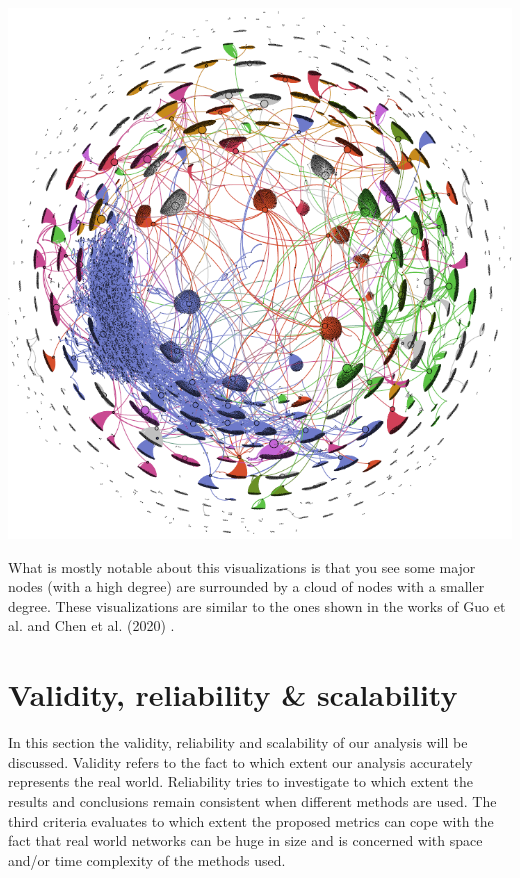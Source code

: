 \documentclass[10pt,a4paper]{article}
\newenvironment{Figure}
  {\par\medskip\noindent\minipage{\linewidth}}
  {\endminipage\par\medskip}
\begin{document}
\begin{multicols}{2}
\begin{Figure}
\centering
\label{fig:my_label}
\includegraphics[scale=0.385]{figures/Marc21_edges.png}
\label{clusters}
\end{Figure}

What is mostly notable about this visualizations is that you see some major nodes (with a high degree) are surrounded by a cloud of nodes with a smaller degree. These visualizations are similar to the ones shown in the works of Guo et al. \cite{GUO201958} and Chen et al. (2020) \cite{chenEthereum}.

\section{Validity, reliability \& scalability}

In this section the validity, reliability and scalability of our analysis will be discussed. Validity refers to the fact to which extent our analysis accurately represents the real world. Reliability tries to investigate to which extent the results and conclusions remain consistent when different methods are used. The third criteria evaluates to which extent the proposed metrics can cope with the fact that real world networks can be huge in size and is concerned with space and/or time complexity of the methods used. 


\end{multicols}
\end{document}
